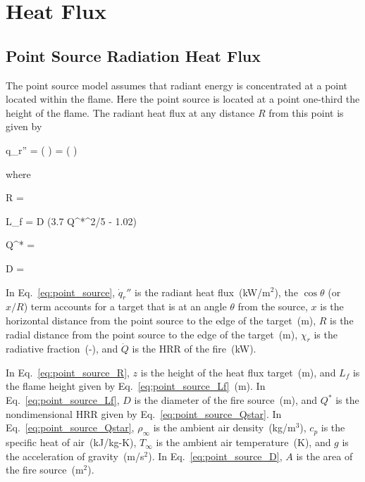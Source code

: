 \chapter{Heat Flux}

\section{Point Source Radiation Heat Flux}

The point source model assumes that radiant energy is concentrated at a point located within the flame. Here the point source is located at a point one-third the height of the flame. The radiant heat flux at any distance $R$ from this point is given by

\be
\dot q_r'' = \cos\theta \left(  \right) =
 \left(  \right)
\label{eq:point_source}
\ee

\noindent where

\be
R = 
\label{eq:point_source_R}
\ee

\be
L_f = D (3.7 Q^{*^{2/5}} - 1.02)
\label{eq:point_source_Lf}
\ee

\be
Q^* = 
\label{eq:point_source_Qstar}
\ee

\be
D = 
\label{eq:point_source_D}
\ee

In Eq.~\ref{eq:point_source}, $\dot q_r''$ is the radiant heat flux~(kW/m$^2$), the $\cos\theta$ (or $x/R$) term accounts for a target that is at an angle $\theta$ from the source, $x$ is the horizontal distance from the point source to the edge of the target~(m), $R$ is the radial distance from the point source to the edge of the target~(m), $\chi_r$ is the radiative fraction~(-), and $\dot Q$ is the HRR of the fire~(kW).

In Eq.~\ref{eq:point_source_R}, $z$ is the height of the heat flux target~(m), and $L_f$ is the flame height given by Eq.~\ref{eq:point_source_Lf}~(m).
In Eq.~\ref{eq:point_source_Lf}, $D$ is the diameter of the fire source~(m), and $Q^*$ is the nondimensional HRR given by Eq.~\ref{eq:point_source_Qstar}. In Eq.~\ref{eq:point_source_Qstar}, $\rho_\infty$ is the ambient air density~(kg/m$^3$), $c_p$ is the specific heat of air~(kJ/kg-K), $T_\infty$ is the ambient air temperature~(K), and $g$ is the acceleration of gravity~(m/s$^2$). In Eq.~\ref{eq:point_source_D}, $A$ is the area of the fire source~(m$^2$).


